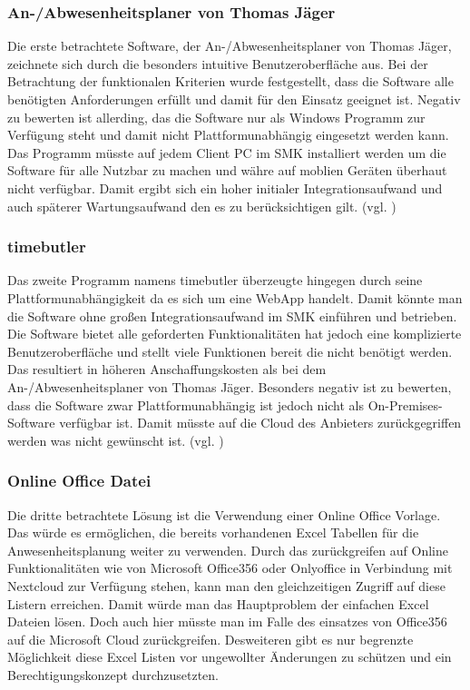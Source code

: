\subsubsection{An-/Abwesenheitsplaner von Thomas Jäger}
\label{sec:AnAbwesenheitsplaner}
Die erste betrachtete Software, der An-/Abwesenheitsplaner von Thomas Jäger, zeichnete sich durch die besonders intuitive Benutzeroberfläche aus. Bei der Betrachtung der funktionalen Kriterien wurde festgestellt, dass die Software alle benötigten Anforderungen erfüllt und damit für den Einsatz geeignet ist. Negativ zu bewerten ist allerding, das die Software nur als Windows Programm zur Verfügung steht und damit nicht Plattformunabhängig eingesetzt werden kann. Das Programm müsste auf jedem Client PC im SMK installiert werden um die Software für alle Nutzbar zu machen und währe auf moblien Geräten überhaut nicht verfügbar. Damit ergibt sich ein hoher initialer Integrationsaufwand und auch späterer Wartungsaufwand den es zu berücksichtigen gilt. (vgl. \cite{AnAbwesenPlaner})

\subsubsection{timebutler}
\label{sec:timebutler}
Das zweite Programm namens timebutler überzeugte hingegen durch seine Plattformunabhängigkeit da es sich um eine WebApp handelt. Damit könnte man die Software ohne großen Integrationsaufwand im SMK einführen und betrieben. Die Software bietet alle geforderten Funktionalitäten hat jedoch eine komplizierte Benutzeroberfläche und stellt viele Funktionen bereit die nicht benötigt werden. Das resultiert in höheren Anschaffungskosten als bei dem An-/Abwesenheitsplaner von Thomas Jäger. Besonders negativ ist zu bewerten, dass die Software zwar Plattformunabhängig ist jedoch nicht als On-Premises-Software verfügbar ist. Damit müsste auf die Cloud des Anbieters zurückgegriffen werden was nicht gewünscht ist. (vgl. \cite{timebutler})

\subsubsection{Online Office Datei}
\label{sec:OnlineOffice}
Die dritte betrachtete Lösung ist die Verwendung einer Online Office Vorlage. Das würde es ermöglichen, die bereits vorhandenen Excel Tabellen für die Anwesenheitsplanung weiter zu verwenden. Durch das zurückgreifen auf Online Funktionalitäten wie von Microsoft Office356 oder Onlyoffice in Verbindung mit Nextcloud zur Verfügung stehen, kann man den gleichzeitigen Zugriff auf diese Listern erreichen. Damit würde man das Hauptproblem der einfachen Excel Dateien lösen. Doch auch hier müsste man im Falle des einsatzes von Office356 auf die Microsoft Cloud zurückgreifen. Desweiteren gibt es nur begrenzte Möglichkeit diese Excel Listen vor ungewollter Änderungen zu schützen und ein Berechtigungskonzept durchzusetzten.

